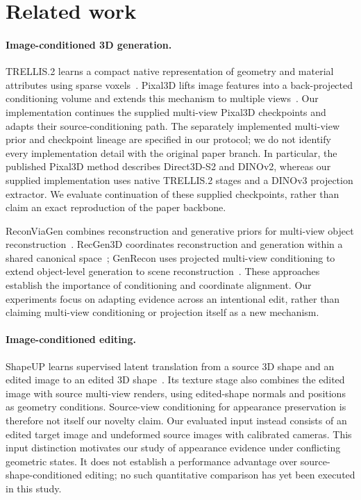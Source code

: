 \section{Related work}
\paragraph{Image-conditioned 3D generation.}
TRELLIS.2 learns a compact native representation of geometry and material
attributes using sparse voxels~\cite{xiang2025trellis2}.
Pixal3D lifts image features into a back-projected conditioning volume and
extends this mechanism to multiple views~\cite{li2026pixal3d}.
Our implementation continues the supplied multi-view Pixal3D checkpoints
and adapts their source-conditioning path. The separately implemented
multi-view prior and checkpoint lineage are specified in our protocol;
we do not identify every implementation detail with the original paper branch.
In particular, the published Pixal3D method describes Direct3D-S2 and DINOv2,
whereas our supplied implementation uses native TRELLIS.2 stages and a
DINOv3 projection extractor. We evaluate continuation of these supplied
checkpoints, rather than claim an exact reproduction of the paper backbone.

ReconViaGen combines reconstruction and generative priors for multi-view
object reconstruction~\cite{chang2025reconviagen}. RecGen3D coordinates
reconstruction and generation within a shared canonical
space~\cite{huang2026recgen3d}; GenRecon uses projected multi-view conditioning
to extend object-level generation to scene
reconstruction~\cite{schmid2026genrecon}. These approaches establish the
importance of conditioning and coordinate alignment. Our experiments focus
on adapting evidence across an intentional edit, rather than claiming
multi-view conditioning or projection itself as a new mechanism.

\paragraph{Image-conditioned editing.}
ShapeUP learns supervised latent translation from a source 3D shape and an
edited image to an edited 3D shape~\cite{gat2026shapeup}.
Its texture stage also combines the edited image with source multi-view
renders, using edited-shape normals and positions as geometry conditions.
Source-view conditioning for appearance preservation is therefore not itself
our novelty claim.
Our evaluated input instead consists of an edited target image and undeformed
source images with calibrated cameras. This input distinction motivates our
study of appearance evidence under conflicting geometric states. It does not
establish a performance advantage over source-shape-conditioned editing;
no such quantitative comparison has yet been executed in this study.

